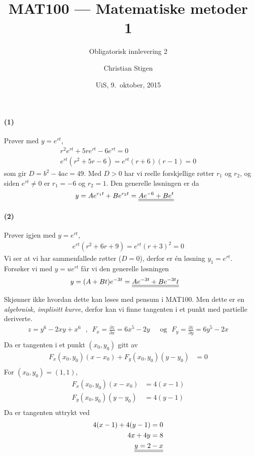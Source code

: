 \documentclass[a4paper,norsk,12pt]{article}
\title{MAT100 --- Matematiske metoder 1}
\subtitle{Obligatorisk innlevering 2}
\author{Christian Stigen}
\date{UiS, 9.~oktober, 2015}
\begin{document}
\maketitle

\paragraph{(1)} Prøver med $y=e^{rt}$,
\begin{align*}
  r^2e^{rt} + 5re^{rt} - 6e^{rt} = 0 \\
  e^{rt}(r^2+5r-6) = e^{rt}(r+6)(r-1) = 0
\end{align*}
%
som gir $D = b^2 - 4ac = 49$. Med $D > 0$ har vi reelle forskjellige røtter
$r_1$ og $r_2$, og siden $e^{rt} \neq 0$ er $r_1=-6$ og $r_2=1$. Den generelle
løsningen er da
%
\begin{align*}
  y & = Ae^{r_1t} + Be^{r_2t} = {\underline{\underline{Ae^{-6} + Be^t}}}
\end{align*}

\paragraph{(2)} Prøver igjen med $y=e^{rt}$,
\begin{align*}
  e^{rt}(r^2 + 6r + 9) = e^{rt}(r+3)^2 = 0
\end{align*}
Vi ser at vi har sammenfallede røtter ($D=0$), derfor er én løsning $y_1 =
e^{rt}$. Forsøker vi med $y = ue^{rt}$ får vi den generelle løsningen
\begin{align*}
  y & = (A + Bt)e^{-3t} = {\underline{\underline{Ae^{-3t} + Be^{-3t}t}}}
\end{align*}

Skjønner ikke hvordan dette kan løses med pensum i MAT100. Men dette er en
\textit{algebraisk, implisitt kurve}, derfor kan vi finne tangenten i et punkt
med partielle deriverte.
\begin{align*}
  z = y^6 - 2xy + x^6 \text{ ~,~ }
  F_x = \frac{ \partial z }{ \partial x } = 6x^5 - 2y & \text{ ~og~ }
  F_y = \frac{ \partial z }{ \partial y } = 6y^5 - 2x \\
\end{align*}
Da er tangenten i et punkt $(x_0, y_0)$ gitt av
\begin{align*}
  F_x(x_0, y_0)(x - x_0) + F_y(x_0, y_0)(y - y_0) & = 0 \\
\end{align*}
For $(x_0, y_0) = (1, 1)$,
\begin{align*}
  F_x(x_0, y_0)(x - x_0) & = 4(x-1) \\
  F_y(x_0, y_0)(y - y_0) & = 4(y-1) \\
\end{align*}
Da er tangenten uttrykt ved
\begin{align*}
  4(x-1) + 4(y-1) = 0 \\
  4x + 4y = 8 \\
  {\underline{\underline{y  = 2 - x}}}
\end{align*}
\end{document}
